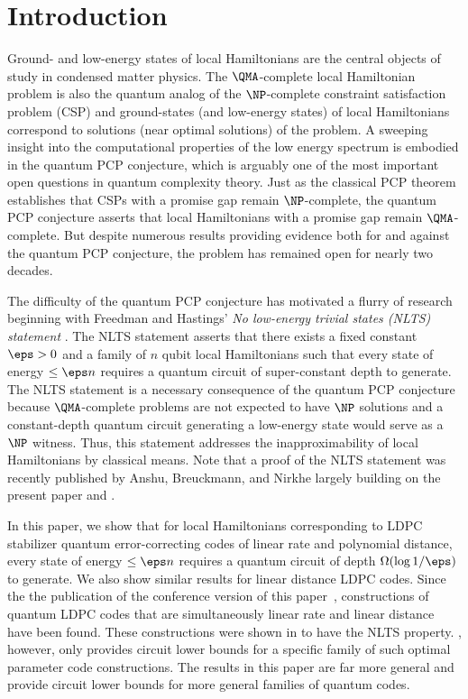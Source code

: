 \documentclass{toc}
\begin{document}
%
%
%


\section{Introduction}

Ground- and low-energy states of local Hamiltonians are the central objects of study in condensed matter physics. The $\QMA$-complete local Hamiltonian problem is also the quantum analog of the $\NP$-complete constraint satisfaction problem (CSP) and ground-states (and low-energy states) of local Hamiltonians correspond to solutions (near optimal solutions) of the problem. A sweeping insight into the computational properties of the low energy spectrum is embodied in the quantum PCP conjecture, which is arguably one of the most important open questions in quantum complexity theory. Just as the classical PCP theorem establishes that CSPs with a promise gap remain $\NP$-complete, the quantum PCP conjecture asserts that local Hamiltonians with a promise gap remain $\QMA$-complete. But despite numerous results providing evidence both for \cite{10.1145/1536414.1536472,10.5555/2600498.2600507,8104078,nirkhe_et_al:LIPIcs:2018:9095,DBLP:conf/focs/NatarajanV18,Eldar2019RobustQE} and against \cite{10.5555/2011637.2011639,10.1145/2488608.2488719,10.1007/s11128-014-0877-9} the quantum PCP conjecture, the problem has remained open for nearly two decades. 

The difficulty of the quantum PCP conjecture has motivated a flurry of research beginning with Freedman and Hastings' \emph{No low-energy trivial states (NLTS) statement} \cite{10.5555/2600498.2600507}. The NLTS statement asserts that there exists a fixed constant $\eps > 0$ and a family of $n$ qubit local Hamiltonians such that every state of energy $\leq \eps n$ requires a quantum circuit of super-constant depth to generate. The NLTS statement is a necessary consequence of the quantum PCP conjecture because $\QMA$-complete problems are not expected to have $\NP$ solutions and a constant-depth quantum circuit generating a low-energy state would serve as a $\NP$ witness. Thus, this statement addresses the inapproximability of local Hamiltonians by classical means. Note that a proof of the NLTS statement was recently published by Anshu, Breuckmann, and Nirkhe \cite{nlts-proof} largely building %
on %
the present paper and \cite{cnlts-proof}.

In this %
paper,   %
we show that for local Hamiltonians corresponding to LDPC stabilizer quantum error-correcting codes of linear rate and polynomial distance, every state of energy $\leq \eps n$ requires a quantum circuit of depth $\Omega(\log 1/\eps)$ to generate. We also show similar results for linear distance LDPC codes. Since the %
the publication of the conference version of this paper~\cite{conf-version},
%
constructions of quantum LDPC codes that are simultaneously linear rate and linear distance have been %
found.  %
These constructions were shown in \cite{nlts-proof} to have the NLTS property. \cite{nlts-proof}, however, only provides circuit lower bounds for a specific family of such optimal parameter code constructions. The results in this %
paper  %
are far more general and provide circuit lower bounds for more general families of quantum codes.
\end{document}
